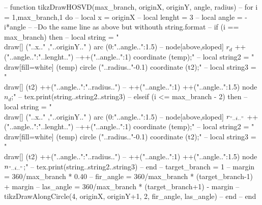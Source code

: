 \begin{luacode*}
-- function tikzDrawHOSVD(max_branch, originX, originY, angle, radius)
--       for i = 1,max_branch,1 do
--       local x = originX
--       local lenght = 3
--       local angle = -i*angle
--       --Do the same line as above but withouth string.format
--       if (i == max_branch) then
--       local string = "\\draw[] ("..x.." ,"..originY.." ) arc (0:"..angle..":1.5) -- node[above,sloped] { $r_{d}$} ++("..angle..":"..lenght..") --++("..angle..":1) coordinate (temp);"
--       local string2 = "\\draw[fill=white] (temp) circle ("..radius.."-0.1)  coordinate (t2);"
--       local string3 = "\\draw[] (t2) ++("..angle..":"..radius..") -- ++("..angle..":1) ++("..angle..":1.5) node {$n_{d}$};"
--       tex.print(string..string2..string3)
--       elseif (i <= max_branch - 2) then
--       local string = "\\draw[] ("..x.." ,"..originY.." ) arc (0:"..angle..":1.5) -- node[above,sloped] { $r_{"..i.."}$} ++("..angle..":"..lenght..")  --++("..angle..":1) coordinate (temp);"
--       local string2 = "\\draw[fill=white] (temp) circle ("..radius.."-0.1) coordinate (t2);"
--       local string3 = "\\draw[] (t2) ++("..angle..":"..radius..") -- ++("..angle..":1) ++("..angle..":1.5) node {$n_{"..i.."}$};"
--       tex.print(string..string2..string3)
--       end
--       target_branch = 1
--       margin = 360/max_branch * 0.40
--       fir_angle = 360/max_branch * (target_branch-1) + margin
--       las_angle = 360/max_branch * (target_branch+1) - margin
--       tikzDrawAlongCircle(4, originX, originY+1, 2, fir_angle, las_angle)
--       end
--     end


\end{luacode*}
